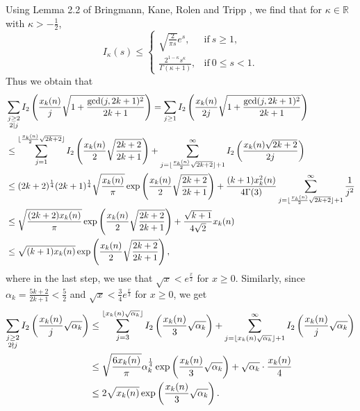 \documentclass[12pt]{article}
\numberwithin{equation}{section}
\begin{document}
Using Lemma 2.2 of Bringmann, Kane, Rolen and Tripp \cite{Bringmann-Kane-Rolen-Tripp-2021}, we find that for $\kappa\in \mathbb{R}$ with $\kappa>-\frac{1}{2}$,
\begin{equation}\label{I-bound}
I_{\kappa}(s) \leq
\begin{cases}
\sqrt{\frac{2}{\pi s}} e^s, & \text{if}~s\geq 1,\\
\frac{2^{1-\kappa}s^\kappa}{\Gamma(\kappa+1)},& \text{if}~ 0\leq s<1.
\end{cases}
\end{equation}
Thus we obtain that
\begin{align}\label{I-bound-1}
&\sum_{\substack{j\geq 2\\2|j}}
I_{2} \left( \frac{x_{k}(n)}{j}\sqrt{1+\frac{\gcd(j,2k+1)^2}{2k+1}} \right)
=\sum_{j\geq 1}
I_{2} \left( \frac{x_{k}(n)}{2j}\sqrt{1+\frac{\gcd(j,2k+1)^2}{2k+1}} \right)
\notag\\
&\leq \sum_{j=1}^{\lfloor\frac{x_{k}(n)}{2}\sqrt{2k+2}\rfloor}
I_{2} \left( \frac{x_{k}(n)}{2}\sqrt{\frac{2k+2}{2k+1}} \right)+\sum_{j= \lfloor\frac{x_{k}(n)}{2}\sqrt{2k+2}\rfloor+1}^\infty I_{2} \left( \frac{x_{k}(n)\sqrt{2k+2}}{2j} \right)
\notag\\
&\leq(2k+2)^{\frac14}(2k+1)^{\frac14}\sqrt{\frac{x_k(n)}{\pi}}
\exp \left( \frac{x_{k}(n)}{2}\sqrt{\frac{2k+2}{2k+1}} \right)+\frac{(k+1)x_k^2(n)}{4\Gamma(3)}\sum_{j= \lfloor\frac{x_{k}(n)}{2}\sqrt{2k+2}\rfloor+1}^\infty\frac{1}{j^2}
\notag\\
&\leq\sqrt{\frac{(2k+2)x_k(n)}{\pi}}
\exp \left( \frac{x_{k}(n)}{2}\sqrt{\frac{2k+2}{2k+1}} \right)+\frac{\sqrt{k+1}}{4\sqrt{2}}x_k(n)
\notag\\
&\leq\sqrt{(k+1)x_k(n)}\exp \left( \frac{x_{k}(n)}{2}\sqrt{\frac{2k+2}{2k+1}} \right),
\end{align}
where in the last step, we use that $\sqrt{x}<e^{\frac x2}$ for $x\geq0$.
Similarly, since $\alpha_k=\frac{5k+2}{2k+1}<\frac 52$ and $\sqrt{x}<\frac{3}{4}e^{\frac x3}$ for $x\geq0$, we get
\begin{align}\label{I-bound-2}
\sum_{\substack{j\geq 2\\2\nmid j }}I_{2} \left( \frac{x_{k}(n)}{j} \sqrt{\alpha_k} \right)
&\leq\sum_{j=3}^{\lfloor x_{k}(n)\sqrt{\alpha_k}\rfloor}I_{2} \left( \frac{x_{k}(n)}{3} \sqrt{\alpha_k} \right)+\sum_{j= \lfloor x_{k}(n)\sqrt{\alpha_k}\rfloor+1}^\infty I_{2} \left( \frac{x_{k}(n)}{j} \sqrt{\alpha_k} \right)
\notag\\
&\leq \sqrt{\frac{6 x_{k}(n)}{\pi}} \alpha_k^{\frac14}
\exp \left( \frac{x_{k}(n)}{3} \sqrt{\alpha_k} \right)+\sqrt{\alpha_k}\cdot\frac{x_k(n)}{4}
\notag\\
&\leq 2\sqrt{x_{k}(n)}\exp \left( \frac{x_{k}(n)}{3} \sqrt{\alpha_k} \right).
\end{align}
\end{document}
